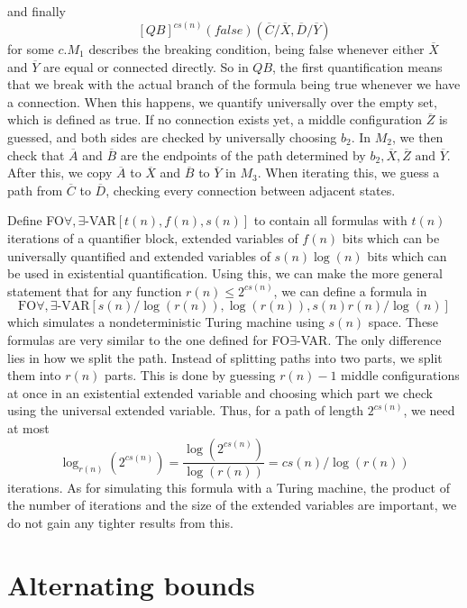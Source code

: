 and finally
\[
    [QB]^{cs(n)}(false)(\overline{C} / \overline{X}, \overline{D} / \overline{Y})
\]
for some $c$.$M_1$ describes the breaking condition, being false whenever either $\overline{X}$ and $\overline{Y}$ are equal or connected directly.
So in $QB$, the first quantification means that we break with the actual branch of the formula being true whenever we have a connection.
When this happens, we quantify universally over the empty set, which is defined as true.
If no connection exists yet, a middle configuration $\overline{Z}$ is guessed, and both sides are checked by universally choosing $b_2$.
In $M_2$, we then check that $\overline{A}$ and $\overline{B}$ are the endpoints of the path determined by $b_2, \overline{X}, \overline{Z} \text{ and }\overline{Y}$.
After this, we copy $\overline{A}$ to $\overline{X}$ and $\overline{B}$ to $\overline{Y}$ in $M_3$.
When iterating this, we guess a path from $\overline{C}$ to $\overline{D}$, checking every connection between adjacent states.

Define FO$\forall, \exists$-VAR$[t(n), f(n), s(n)]$ to contain all formulas with $t(n)$ iterations of a quantifier block, extended variables of $f(n)$ bits which can be universally quantified and extended variables of $s(n)\log(n)$ bits  which can be used in existential quantification.
Using this, we can make the more general statement that for any function $r(n) \leq 2^{cs(n)}$, we can define a formula in \[\text{FO$\forall, \exists$-VAR$[s(n)/\log(r(n)), \log(r(n)), s(n)r(n)/\log(n)]$}\] which simulates a nondeterministic Turing machine using $s(n)$ space.
These formulas are very similar to the one defined for FO$\exists$-VAR.
The only difference lies in how we split the path.
Instead of splitting paths into two parts, we split them into $r(n)$ parts.
This is done by guessing $r(n) - 1$ middle configurations at once in an existential extended variable and choosing which part we check using the universal extended variable.
Thus, for a path of length $2^{cs(n)}$, we need at most \[\log_{r(n)}\left(2^{cs(n)}\right) = \frac{\log\left(2^{cs(n)}\right)}{\log(r(n))} = cs(n)/\log(r(n))\] iterations.
As for simulating this formula with a Turing machine, the product of the number of iterations and the size of the extended variables are important, we do not gain any tighter results from this.


\section{Alternating bounds}\label{sec:alternating-bounds}


